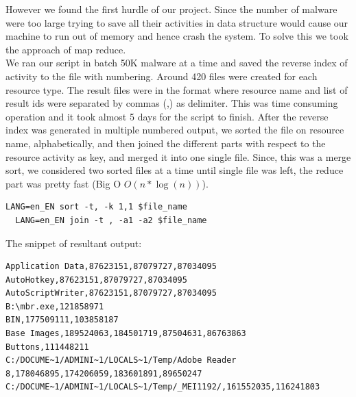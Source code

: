 However we found the first hurdle of our project. Since the number of malware were too large trying to save all their activities in data structure would cause our machine to run out of memory and hence crash the system. To solve this we took the approach of map reduce.\\
We ran our script in batch 50K malware at a time and saved the reverse index of activity to the file with numbering. Around 420 files were created for each resource type. The result files were in the format where resource name and list of result ids were separated by commas (,) as delimiter.
This was time consuming operation and it took almost 5 days for the script to finish. After the reverse index was generated in multiple numbered output, we sorted the file on resource name, alphabetically, and then joined the different parts with respect to the resource activity as key, and merged it into one single file.
Since, this was a merge sort, we considered two sorted files at a time until single file was left, the reduce part was pretty fast (Big O $O( n * \log(n))$).

\begin{lstlisting}[numbers=none]
  LANG=en_EN sort -t, -k 1,1 $file_name
  LANG=en_EN join -t , -a1 -a2 $file_name
\end{lstlisting}
The snippet of resultant output:
\begin{lstlisting}[numbers=none]
Application Data,87623151,87079727,87034095
AutoHotkey,87623151,87079727,87034095
AutoScriptWriter,87623151,87079727,87034095
B:\mbr.exe,121858971
BIN,177509111,103858187
Base Images,189524063,184501719,87504631,86763863
Buttons,111448211
C:/DOCUME~1/ADMINI~1/LOCALS~1/Temp/Adobe Reader 8,178046895,174206059,183601891,89650247
C:/DOCUME~1/ADMINI~1/LOCALS~1/Temp/_MEI1192/,161552035,116241803
\end{lstlisting}


